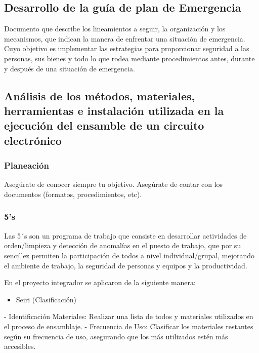     \subsection{Desarrollo de la guía de plan de Emergencia}
    
    Documento que describe los lineamientos a seguir, la organización y los mecanismos, que indican la manera de enfrentar una situación de emergencia. Cuyo objetivo es implementar las estrategias para proporcionar seguridad a las personas, sus bienes y todo lo que rodea mediante procedimientos antes, durante y después de una situación de emergencia.
    
    \subsection{Análisis de los métodos, materiales, herramientas e instalación utilizada en la ejecución del ensamble de un circuito electrónico}
    
    \subsubsection{Planeación}
    
    Asegúrate de conocer siempre tu objetivo.
    Asegúrate de contar con los documentos (formatos, procedimientos, etc).
    \subsubsection{5's}
    
    Las 5´s son un programa de trabajo que consiste en desarrollar actividades de orden/limpieza y detección de anomalías en el puesto de trabajo, que por su sencillez permiten la participación de todos a nivel individual/grupal, mejorando el ambiente de trabajo, la seguridad de personas y equipos y la productividad.
    
    En el proyecto integrador se aplicaron de la siguiente manera:
    
    \begin{itemize}
        \item Seiri (Clasificación)
    \end{itemize}
    
    - Identificación Materiales: Realizar una lista de todos y materiales utilizados en el proceso de ensamblaje.
    \newline
    - Frecuencia de Uso: Clasificar los materiales restantes según su frecuencia de uso, asegurando que los más utilizados estén más accesibles.
    
